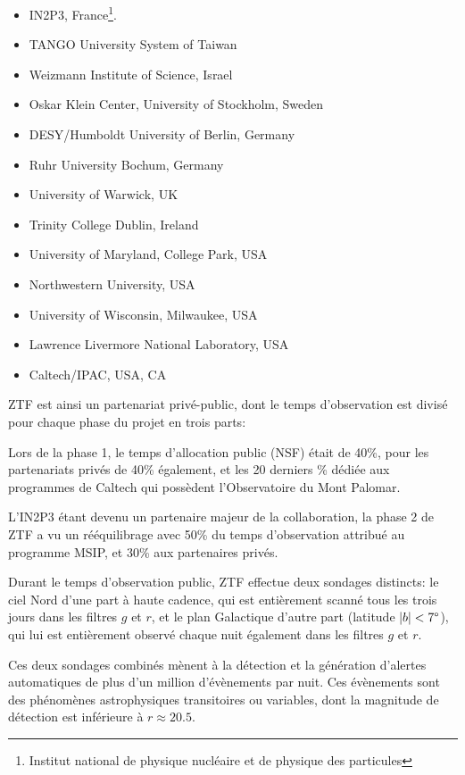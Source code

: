 \documentclass[../main/main.tex]{subfiles}
\begin{document}
\begin{multicols}{2}
\begin{itemize}[noitemsep, label=$\bullet$]
    \item IN2P3, France\footnote{Institut national de physique nucléaire et de physique
    des particules}.
    \item TANGO University System of Taiwan
    \item Weizmann Institute of Science, Israel
    \item Oskar Klein Center, University of Stockholm, Sweden
    \item DESY/Humboldt University of Berlin, Germany
    \item Ruhr University Bochum, Germany
    \item University of Warwick, UK
    \item Trinity College Dublin, Ireland
    \item University of Maryland, College Park, USA
    \item Northwestern University, USA
    \item University of Wisconsin, Milwaukee, USA
    \item Lawrence Livermore National Laboratory, USA
    \item Caltech/IPAC, USA, CA
\end{itemize}
\end{multicols}

ZTF est ainsi un partenariat privé-public, dont le temps d'observation
est divisé pour chaque phase du projet en trois parts:

Lors de la phase 1, le temps d'allocation public (NSF) était de 40\%,
pour les partenariats privés de 40\% également, et les 20 derniers \%
dédiée aux programmes de Caltech qui possèdent l'Observatoire du Mont
Palomar.

L'IN2P3 étant devenu un partenaire majeur de la collaboration, la phase 2
de ZTF a vu un rééquilibrage avec 50\% du temps d'observation attribué
au programme MSIP, et 30\% aux partenaires privés.

Durant le temps d'observation public, ZTF effectue deux sondages distincts: le ciel
Nord d'une part à haute cadence, qui est entièrement scanné tous les trois jours dans les
filtres $g$ et $r$, et le plan
Galactique d'autre part (latitude $|b|<7\degree$), qui lui est entièrement observé chaque nuit
également dans les filtres $g$ et $r$.

Ces deux sondages combinés mènent à la détection et la génération
d'alertes automatiques de plus d'un million d'évènements par nuit. Ces
évènements sont des phénomènes astrophysiques transitoires ou variables,
dont la magnitude de détection est inférieure à $r\approx 20.5$.
\end{document}
